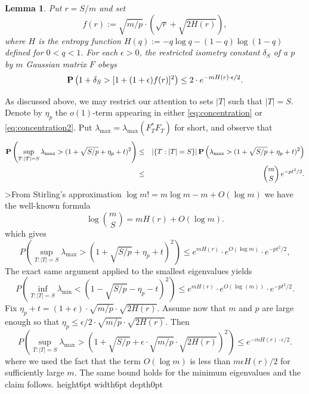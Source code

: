 \documentclass[11pt]{article}
\def\P{{\hbox{\bf P}}}
\newenvironment{proof}{\noindent {\bf Proof} }{\endprf\par}
\def \endprf{\hfill {\vrule height6pt width6pt depth0pt}\medskip}
\newcommand{\<}{\langle}
\renewcommand{\>}{\rangle}
\newtheorem{lemma}[theorem]{Lemma}
\numberwithin{equation}{section}
\begin{document}
\begin{lemma}
\label{teo:Gauss_delta_S}
Put $r = S/m$ and set 
\[
f(r) := \sqrt{m/p} \cdot \left(\sqrt{r} + \sqrt{2H(r)}\right), 
\] 
where $H$ is the entropy function $H(q) := - q\log q - (1-q)
\log(1-q)$ defined for $0 < q < 1$.  For each $\epsilon> 0$, the
restricted isometry constant $\delta_S$ of a $p$ by $m$ Gaussian
matrix $F$ obeys
\begin{equation}
\label{large-dev}
  \P\left(1 + \delta_S > [1 + (1 + \epsilon) f(r)]^2\right) \le 2 
\cdot e^{-m H(r) \cdot \epsilon/2}.
\end{equation}
\end{lemma}
\begin{proof}
  As discussed above, we may restrict our attention to sets $|T|$ such
  that $|T| = S$. Denote by $\eta_p$ the $o(1)$-term appearing in
  either \eqref{eq:concentration} or \eqref{eq:concentration2}. Put
  $\lambda_{\max} = \lambda_{\max}(F_T^* F_T)$ for short, and observe
  that
\begin{eqnarray*}
\P\left(\sup_{T: |T| = S} \lambda_{\max} > 
(1 + \sqrt{S/p} + \eta_p + t)^2\right) & \le &  |\{T: |T| = S\}|  
\, \P\left(\lambda_{\max} > (1 + \sqrt{S/p} + \eta_p + t)^2\right) \\
& \le &  \binom{m}{S} \, e^{-pt^2/2}.  
\end{eqnarray*}
>From Stirling's approximation $\log m! = m \log m - m + O(\log m)$ we have
the well-known formula
\[
\log \binom{m}{S} = m H(r) + O(\log m).
\]
which gives
\[
P\left(\sup_{T: |T| = S} \lambda_{\max} > 
(1 + \sqrt{S/p} +  \eta_p + t)^2\right) 
\le e^{m H(r)} \cdot e^{O(\log m)} \cdot e^{-pt^2/2},
\]
The exact same argument
applied to the smallest eigenvalues yields
\[
P\left(\inf_{T: |T| = S} \lambda_{\min} < (1 - \sqrt{S/p} -\eta_p -
  t)^2\right) \le e^{m H(r)} \cdot e^{O(\log(m))} \cdot e^{-pt^2/2}.
\]
Fix $\eta_p + t = (1+\epsilon) \cdot \sqrt{m/p} \cdot \sqrt{2H(r)}$. Assume
now that $m$ and $p$ are large enough so that 
$\eta_p \le \epsilon/2 \cdot \sqrt{m/p} \cdot \sqrt{2H(r)}$. Then
\[
P\left(\sup_{T: |T| = S} \lambda_{\max} > (1 + \sqrt{S/p} + \epsilon
  \cdot \sqrt{m/p} \cdot \sqrt{2H(r)})^2\right) \le e^{-m H(r) \cdot
  \epsilon/2}.
\]
where we used the fact that the term $O(\log m)$ is less than $m
\epsilon H(r)/2$ for sufficiently large $m$.  The same bound holds for
the minimum eigenvalues and the claim follows.
\end{proof}
\end{document}
